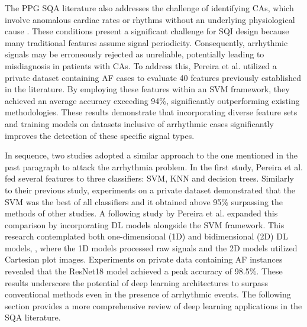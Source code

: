\documentclass[final,3p,times,twocolumn]{elsarticle}
\begin{document}
The \gls{PPG} \gls{SQA} literature also addresses the challenge of identifying \glspl{CA}, which involve anomalous cardiac rates or rhythms without an underlying physiological cause \cite{arrhythmia-1}.
These conditions present a significant challenge for \gls{SQI} design because many traditional features assume signal periodicity.
Consequently, arrhythmic signals may be erroneously rejected as unreliable, potentially leading to misdiagnosis in patients with \glspl{CA}.
To address this, Pereira et al. \cite{arrhythmia-2} utilized a private dataset containing \gls{AF} cases to evaluate 40 features previously established in the literature. By employing these features within an \gls{SVM} framework, they achieved an average accuracy exceeding 94\%, significantly outperforming existing methodologies.
These results demonstrate that incorporating diverse feature sets and training models on datasets inclusive of arrhythmic cases significantly improves the detection of these specific signal types.

In sequence, two studies adopted a similar approach to the one mentioned in the past paragraph to attack the arrhythmia problem.
In the first study, Pereira et al. \cite{arrhythmia-3} fed several features to three classifiers: \gls{SVM}, \gls{KNN} and decision trees.
Similarly to their previous study, experiments on a private dataset demonstrated that the \gls{SVM} was the best of all classifiers and it obtained above 95\% surpassing the methods of other studies.
A following study by Pereira et al. \cite{arrhythmia-4} expanded this comparison by incorporating \gls{DL} models alongside the \gls{SVM} framework.
This research contemplated both one-dimensional (1D) and bidimensional (2D) \gls{DL} models, , where the 1D models processed raw signals and the 2D models utilized Cartesian plot images.
Experiments on private data containing \gls{AF} instances revealed that the ResNet18 model achieved a peak accuracy of 98.5\%.
These results underscore the potential of deep learning architectures to surpass conventional methods even in the presence of arrhythmic events.
The following section provides a more comprehensive review of deep learning applications in the \gls{SQA} literature.
\end{document}
